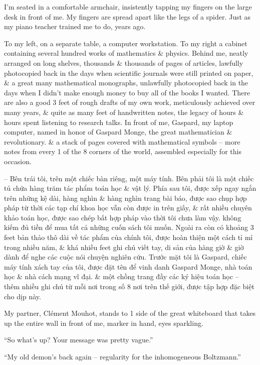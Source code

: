 \documentclass{article}
\begin{document}
\begin{enumerate}
	I'm seated in a comfortable armchair, insistently tapping my fingers on the large desk in front of me. My fingers are spread apart like the legs of a spider. Just as my piano teacher trained me to do, years ago.
	
	To my left, on a separate table, a computer workstation. To my right a cabinet containing several hundred works of mathematics \& physics. Behind me, neatly arranged on long shelves, thousands \& thousands of pages of articles, lawfully photocopied back in the days when scientific journals were  still printed on paper, \& a great many mathematical monographs, unlawfully photocopied back in the days when I didn't make enough money to buy all of the books I wanted. There are also a good 3 feet of rough drafts of my own work, meticulously achieved over many years, \& quite as many feet of handwritten notes, the legacy of hours \& hours spent listening to research talks. In front of me, Gaspard, my laptop computer, named in honor of Gaspard Monge, the great mathematician \& revolutionary. \& a stack of pages covered with mathematical symbols -- more notes from every 1 of the 8 corners of the world, assembled especially for this occasion.
	
	-- Bên trái tôi, trên một chiếc bàn riêng, một máy tính. Bên phải tôi là một chiếc tủ chứa hàng trăm tác phẩm toán học \& vật lý. Phía sau tôi, được xếp ngay ngắn trên những kệ dài, hàng nghìn \& hàng nghìn trang bài báo, được sao chụp hợp pháp từ thời các tạp chí khoa học vẫn còn được in trên giấy, \& rất nhiều chuyên khảo toán học, được sao chép bất hợp pháp vào thời tôi chưa làm vậy. không kiếm đủ tiền để mua tất cả những cuốn sách tôi muốn. Ngoài ra còn có khoảng 3 feet bản thảo thô dài về tác phẩm của chính tôi, được hoàn thiện một cách tỉ mỉ trong nhiều năm, \& khá nhiều feet ghi chú viết tay, di sản của hàng giờ \& giờ dành để nghe các cuộc nói chuyện nghiên cứu. Trước mặt tôi là Gaspard, chiếc máy tính xách tay của tôi, được đặt tên để vinh danh Gaspard Monge, nhà toán học \& nhà cách mạng vĩ đại. \& một chồng trang đầy các ký hiệu toán học -- thêm nhiều ghi chú từ mỗi nơi trong số 8 nơi trên thế giới, được tập hợp đặc biệt cho dịp này.
	
	My partner, Cl\'ement Mouhot, stands to 1 side of the great whiteboard that takes up the entire wall in front of me, marker in hand, eyes sparkling.
	
	``So what's up? Your message was pretty vague.''
	
	``My old demon's back again -- regularity for the inhomogeneous Boltzmann.''
	

\end{enumerate}
\end{document}
